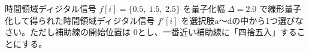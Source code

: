 時間領域ディジタル信号 $f[i] = \{0.5,\ 1.5,\ 2.5 \}$ を量子化幅 $\Delta = 2.0$ で線形量子化して得られた時間領域ディジタル信号 $f'[i]$ を選択肢a〜dの中から1つ選びなさい。ただし補助線の開始位置は $0$とし、一番近い補助線に「四捨五入」することにする。
